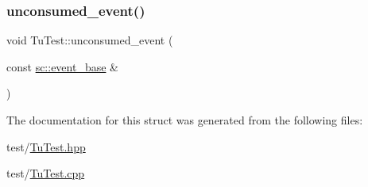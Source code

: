\subsubsection{\texorpdfstring{unconsumed\+\_\+event()}{unconsumed\_event()}}
{\footnotesize\ttfamily void Tu\+Test\+::unconsumed\+\_\+event (\begin{DoxyParamCaption}\item[{const \mbox{\hyperlink{classboost_1_1statechart_1_1event__base}{sc\+::event\+\_\+base}} \&}]{ }\end{DoxyParamCaption})}



The documentation for this struct was generated from the following files\+:\begin{DoxyCompactItemize}
\item 
test/\mbox{\hyperlink{_tu_test_8hpp}{Tu\+Test.\+hpp}}\item 
test/\mbox{\hyperlink{_tu_test_8cpp}{Tu\+Test.\+cpp}}\end{DoxyCompactItemize}
